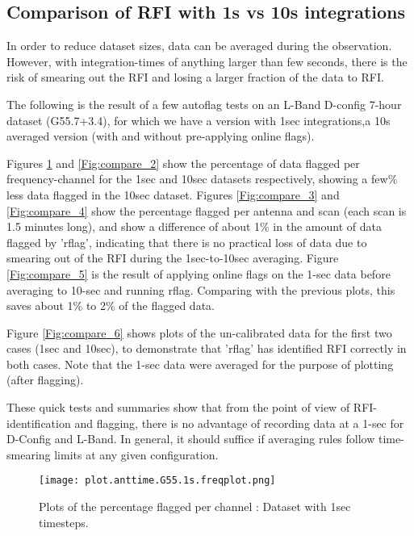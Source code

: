 \subsection{Comparison of RFI with 1s vs 10s integrations}
In order to reduce dataset sizes, data can be averaged during the observation. However, with integration-times of anything larger than few seconds, there is the risk of smearing out the RFI and losing a larger fraction of the data to RFI.   

The following is the result of a few autoflag tests on an L-Band D-config 7-hour dataset (G55.7+3.4), for which we have a version with 1sec integrations,a 10s averaged version (with and without pre-applying online flags).


Figures \ref{Fig:compare_1} and \ref{Fig:compare_2} show the percentage of data flagged per frequency-channel for the 1sec and 10sec datasets respectively, showing a few\% less data flagged in the 10sec dataset.  Figures \ref{Fig:compare_3} and \ref{Fig:compare_4} show the percentage flagged per antenna and scan (each scan is 1.5 minutes long), and show a difference of about 1\% in the amount of data flagged by 'rflag', indicating that there is no practical loss of data due to smearing out of the RFI during the 1sec-to-10sec averaging. 
Figure  \ref{Fig:compare_5} is the result of applying online flags on the 1-sec data before averaging to 10-sec and running rflag. Comparing with the previous plots, this saves about 1\% to 2\% of the flagged data. 

Figure  \ref{Fig:compare_6} shows plots of the un-calibrated data for the first two cases (1sec and 10sec), to demonstrate that 'rflag' has identified RFI correctly in both cases. Note that the 1-sec data were averaged for the purpose of plotting (after flagging).

These quick tests and summaries show that from the point of view of RFI-identification and flagging, there is no advantage of recording data at a 1-sec for D-Config and L-Band. In general, it should suffice if averaging rules follow time-smearing limits at any given configuration.

\begin{figure}
\texttt{[image: plot.anttime.G55.1s.freqplot.png]}
\caption{Plots of the percentage flagged per channel :  Dataset with 1sec timesteps.}
\label{Fig:compare_1}
\end{figure}

